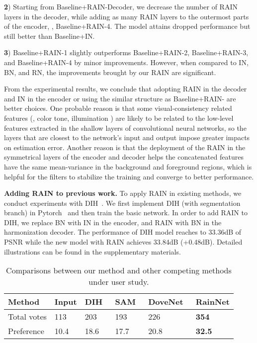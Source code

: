 \documentclass[final]{cvpr}
\begin{document}
\noindent
\textbf{2}) Starting from Baseline+RAIN-Decoder, we decrease the number of RAIN layers in the decoder, while adding as many RAIN layers to the outermost parts of the encoder, \ie, Baseline+RAIN-4. The model attains dropped performance but still better than Baseline+IN. 

\noindent
\textbf{3}) Baseline+RAIN-1 slightly outperforms Baseline+RAIN-2, Baseline+RAIN-3, and Baseline+RAIN-4 by minor improvements. However, when compared to IN, BN, and RN, the improvements brought by our RAIN are significant.

From the experimental results, we conclude that adopting RAIN in the decoder and IN in the encoder or using the similar structure as Baseline+RAIN- are better choices. One probable reason is that some visual-consistency related features (\eg, color tone, illumination \etc) are likely to be related to the low-level features extracted in the shallow layers of convolutional neural networks, so the layers that are closest to the network’s input and output impose greater impacts on estimation error. Another reason is that the deployment of the RAIN in the symmetrical layers of the encoder and decoder helps the concatenated features have the same mean-variance in the background and foreground regions, which is helpful for the filters to stabilize the training and converge to better performance.


\noindent
\textbf{Adding RAIN to previous work.} To apply RAIN in existing methods, we conduct experiments with DIH~\cite{tsai2017deep}. We first implement DIH (with segmentation branch) in Pytorch~\cite{paszke2017automatic} and then train the basic network. In order to add RAIN to DIH, we replace BN with IN in the encoder, and RAIN with BN in the harmonization decoder. The performance of DIH model reaches to 33.36dB of PSNR while the new model with RAIN achieves 33.84dB (+0.48dB). Detailed illustrations can be found in the supplementary materials.

\begin{table}
\footnotesize
\begin{center}
\begin{tabular}{p{1.3cm}<{\centering}p{0.6cm}<{\centering}p{0.8cm}<{\centering}p{1cm}<{\centering}p{1.1cm}<{\centering}p{1.0cm}<{\centering}}
\toprule
Method & Input & DIH~\cite{tsai2017deep} & SAM~\cite{cun2020improving} & DoveNet~\cite{cong2020dovenet} & RainNet\\
\midrule
Total votes & 113 & 203 & 193 & 226 & \textbf{354} \\
Preference & 10.4 & 18.6 & 17.7 & 20.8 & \textbf{32.5} \\
\bottomrule
\end{tabular}
\end{center}
\caption{Comparisons between our method and other competing methods under user study.}
\label{tab:user_study}
\end{table}
\end{document}
